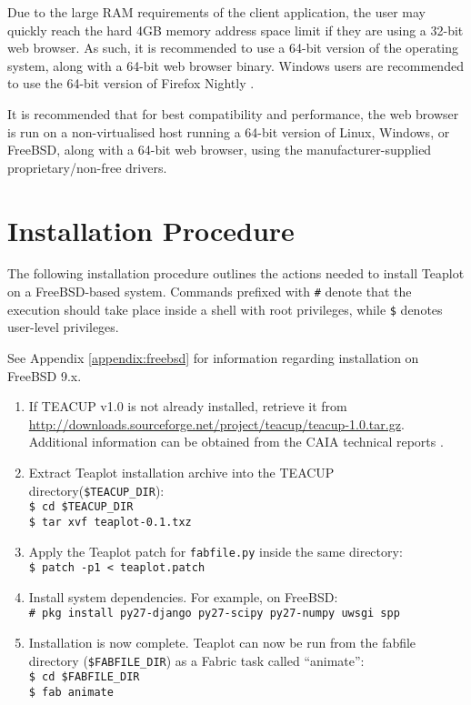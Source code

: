 \documentclass[a4paper,twocolumn,english,11pt, a4paper, conference]{IEEEtran}
\newcommand{\sh}[2]{{\small \texttt{#1 #2}}}
\begin{document}
Due to the large RAM requirements of the client application, the user may quickly reach the hard 4GB memory address space limit if they are using a 32-bit web browser. As such, it is recommended to use a 64-bit version of the operating system, along with a 64-bit web browser binary. Windows users are recommended to use the 64-bit version of Firefox Nightly \cite{firefoxnightly}.

It is recommended that for best compatibility and performance, the web browser is run on a non-virtualised host running a 64-bit version of Linux, Windows, or FreeBSD, along with a 64-bit web browser, using the manufacturer-supplied proprietary/non-free drivers. 

\section{Installation Procedure}
\label{sect:installation}
The following installation procedure outlines the actions needed to install Teaplot on a FreeBSD-based system. Commands prefixed with \texttt{\#} denote that the execution should take place inside a shell with root privileges, while \texttt{\$} denotes user-level privileges.

See Appendix \ref{appendix:freebsd} for information regarding installation on FreeBSD 9.x.

\begin{enumerate}
	\item If TEACUP v1.0 is not already installed, retrieve it from \url{http://downloads.sourceforge.net/project/teacup/teacup-1.0.tar.gz}. Additional information can be obtained from the CAIA technical reports \cite{CAIA-TR-150529A} \cite{CAIA-TR-150210C}.
	\item  Extract Teaplot installation archive into the TEACUP directory(\texttt{\$TEACUP\_DIR})\footnotemark[1] :\\
		\sh{\$}{cd \$TEACUP\_DIR} \\
		\sh{\$}{tar xvf teaplot-0.1.txz}
	\item Apply the Teaplot patch for \texttt{fabfile.py} inside the same directory: \\
		\sh{\$}{patch -p1 < teaplot.patch}
	\item Install system dependencies. For example, on FreeBSD\footnotemark[2]: \\ 
		\sh{\#}{pkg install py27-django py27-scipy py27-numpy uwsgi spp} 
	\item Installation is now complete. Teaplot can now be run from the fabfile
	directory (\texttt{\$FABFILE\_DIR}) \footnotemark[3] as a Fabric task called ``animate'': \\
		\sh{\$}{cd \$FABFILE\_DIR} \\
		\sh{\$}{fab animate}
\end{enumerate}
\end{document}
